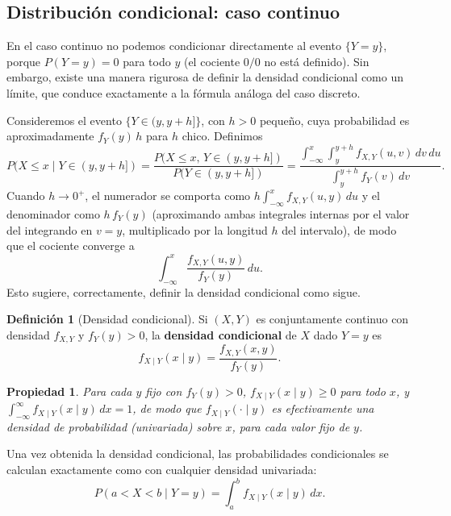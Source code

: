 \documentclass[11pt,a4paper]{article}
\theoremstyle{plain}
\newtheorem{propiedad}[teorema]{Propiedad}
\theoremstyle{definition}
\newtheorem{definicion}[teorema]{Definición}
\theoremstyle{remark}
\begin{document}
\subsection{Distribución condicional: caso continuo}

En el caso continuo no podemos condicionar directamente al evento $\{Y=y\}$, porque $P(Y=y)=0$ para todo $y$ (el cociente $0/0$ no está definido). Sin embargo, existe una manera rigurosa de definir la densidad condicional como un límite, que conduce exactamente a la fórmula análoga del caso discreto.

Consideremos el evento $\{Y\in(y,y+h]\}$, con $h>0$ pequeño, cuya probabilidad es aproximadamente $f_Y(y)\,h$ para $h$ chico. Definimos
\[
P(X\le x \mid Y\in(y,y+h]) = \frac{P(X\le x,\, Y\in(y,y+h])}{P(Y\in(y,y+h])} = \frac{\int_{-\infty}^x \int_y^{y+h} f_{X,Y}(u,v)\,dv\,du}{\int_y^{y+h} f_Y(v)\,dv}.
\]
Cuando $h\to0^+$, el numerador se comporta como $h\int_{-\infty}^x f_{X,Y}(u,y)\,du$ y el denominador como $h\,f_Y(y)$ (aproximando ambas integrales internas por el valor del integrando en $v=y$, multiplicado por la longitud $h$ del intervalo), de modo que el cociente converge a
\[
\int_{-\infty}^x \frac{f_{X,Y}(u,y)}{f_Y(y)}\,du.
\]
Esto sugiere, correctamente, definir la densidad condicional como sigue.

\begin{definicion}[Densidad condicional]
Si $(X,Y)$ es conjuntamente continuo con densidad $f_{X,Y}$ y $f_Y(y)>0$, la \textbf{densidad condicional} de $X$ dado $Y=y$ es
\[
f_{X\mid Y}(x\mid y) = \frac{f_{X,Y}(x,y)}{f_Y(y)}.
\]
\end{definicion}

\begin{propiedad}
Para cada $y$ fijo con $f_Y(y)>0$, $f_{X\mid Y}(x\mid y)\ge0$ para todo $x$, y $\displaystyle\int_{-\infty}^{\infty} f_{X\mid Y}(x\mid y)\,dx=1$, de modo que $f_{X\mid Y}(\cdot\mid y)$ es efectivamente una densidad de probabilidad (univariada) sobre $x$, para cada valor fijo de $y$.
\end{propiedad}

Una vez obtenida la densidad condicional, las probabilidades condicionales se calculan exactamente como con cualquier densidad univariada:
\[
P(a<X<b\mid Y=y) = \int_a^b f_{X\mid Y}(x\mid y)\,dx.
\]
\end{document}
